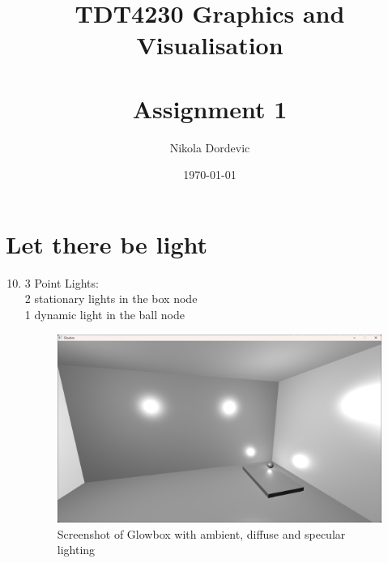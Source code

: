 \documentclass[11pt,a4paper]{report}
\title{TDT4230 Graphics and Visualisation \\\\ Assignment 1}
\author{Nikola Dordevic}
\date{\today}
\begin{document}
\section{Let there be light}
\begin{enumerate}[label=(\alph*)]\setcounter{enumi}{9}
	\item 3 Point Lights: \\ \hspace*{5mm} 2 stationary lights in the box node \\ \hspace*{5mm} 1 dynamic light in the ball node
	
	\begin{figure}[h]
		\centering
		\includegraphics[width=\textwidth]{images/task1j.png}
		\caption{Screenshot of Glowbox with ambient, diffuse and specular lighting}
	\end{figure}
\end{enumerate}

\clearpage
\end{document}
